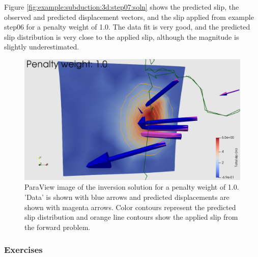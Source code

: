Figure \vref{fig:example:subduction:3d:step07:soln} shows the
predicted slip, the observed and predicted displacement vectors, and
the slip applied from example step06 for a penalty weight of 1.0. The
data fit is very good, and the predicted slip distribution is very
close to the applied slip, although the magnitude is slightly
underestimated.

\begin{figure}
  \includegraphics[width=4.5in]{examples/figs/subduction3d_step07_inverse_soln}
  \caption{ParaView image of the inversion solution for a penalty
    weight of 1.0. 'Data' is shown with blue arrows and predicted
    displacements are shown with magenta arrows. Color contours
    represent the predicted slip distribution and orange line contours
    show the applied slip from the forward problem.}
  \label{fig:example:subduction:3d:step07:soln}
\end{figure}

\subsubsection{Exercises}

